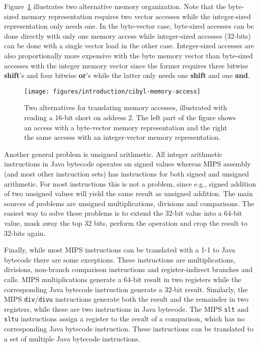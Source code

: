 
Figure~\ref{fig:introduction:cibyl-memory-access} illustrates two alternative
memory organization. Note that the byte-sized memory representation requires
two vector accesses while the integer-sized representation only needs one. In
the byte-vector case, byte-sized accesses can be done directly with only one
memory access while integer-sized accesses (32-bits) can be done with a single
vector load in the other case. Integer-sized accesses are also proportionally
more expensive with the byte memory vector than byte-sized accesses with the
integer memory vector since the former requires three bitwise \textbf{shift}'s
and four bitwise \textbf{or}'s while the latter only needs one \textbf{shift}
and one \textbf{and}.

\begin{figure}[t]
  \begin{center}
    \texttt{[image: figures/introduction/cibyl-memory-access]}
  \end{center}
  \caption[Translating memory accesses]{Two alternatives for translating memory accesses, illustrated with
    reading a 16-bit short on address 2. The left part of the figure shows an
    access with a byte-vector memory representation and the right the same
    accesss with an integer-vector memory representation.}
  \label{fig:introduction:cibyl-memory-access}
\end{figure}

Another general problem is unsigned arithmetic. All integer arithmetic
instructions in Java bytecode operates on signed values whereas MIPS assembly
(and most other instruction sets) has instructions for both signed and
unsigned arithmetic. For most instructions this is not a problem, since e.g.,
signed addition of two unsigned values will yield the same result as unsigned
addition. The main sources of problems are unsigned multiplications, divisions and
comparisons. The easiest way to solve these problems is to extend the 32-bit
value into a 64-bit value, mask away the top 32 bits, perform the operation
and crop the result to 32-bits again.

Finally, while most MIPS instructions can be translated with a 1-1 to Java
bytecode there are some exceptions. These instructions are multiplications,
divisions, non-branch comparison instructions and register-indirect branches
and calls. MIPS multiplications generate a 64-bit result in two registers
while the corresponding Java bytecode instruction generate a 32-bit result.
Similarly, the MIPS \texttt{div}/\texttt{divu} instructions generate both the
result and the remainder in two registers, while these are two instructions in
Java bytecode. The MIPS \texttt{slt} and \texttt{sltu} instructions assign a
register to the result of a comparison, which has no corresponding Java
bytecode instruction. These instructions can be translated to a set of
multiple Java bytecode instructions.

